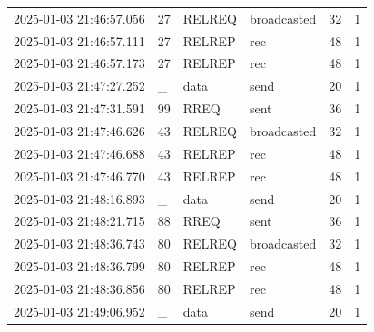 \documentclass[]{nsm-thesis}
\begin{document}
\begin{longtable}{llllll}
2025-01-03 21:46:57.056 & 27 & RELREQ & broadcasted & 32 & 1 \\
2025-01-03 21:46:57.111 & 27 & RELREP & rec & 48 & 1 \\
2025-01-03 21:46:57.173 & 27 & RELREP & rec & 48 & 1 \\
2025-01-03 21:47:27.252 & _ & data & send & 20 & 1 \\
2025-01-03 21:47:31.591 & 99 & RREQ & sent & 36 & 1 \\
2025-01-03 21:47:46.626 & 43 & RELREQ & broadcasted & 32 & 1 \\
2025-01-03 21:47:46.688 & 43 & RELREP & rec & 48 & 1 \\
2025-01-03 21:47:46.770 & 43 & RELREP & rec & 48 & 1 \\
2025-01-03 21:48:16.893 & _ & data & send & 20 & 1 \\
2025-01-03 21:48:21.715 & 88 & RREQ & sent & 36 & 1 \\
2025-01-03 21:48:36.743 & 80 & RELREQ & broadcasted & 32 & 1 \\
2025-01-03 21:48:36.799 & 80 & RELREP & rec & 48 & 1 \\
2025-01-03 21:48:36.856 & 80 & RELREP & rec & 48 & 1 \\
2025-01-03 21:49:06.952 & _ & data & send & 20 & 1 \\
\bottomrule
\end{longtable}
\clearpage
\end{document}

